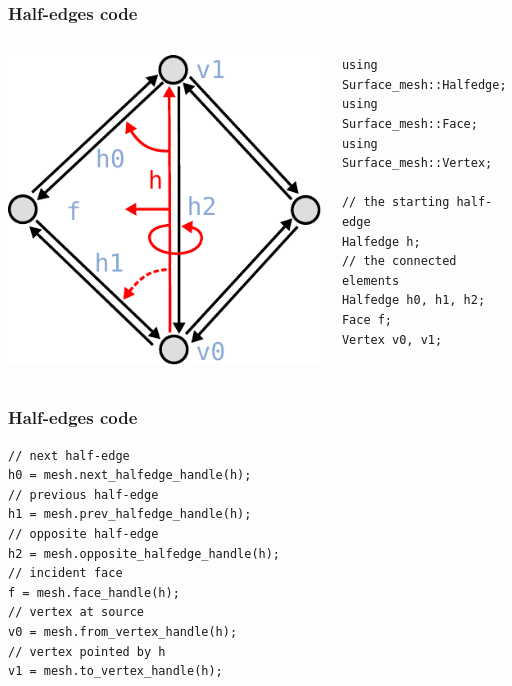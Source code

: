 \begin{frame}[fragile]
\frametitle{Half-edges code}
\begin{columns}[c]
  \begin{column}{0.4\textwidth}
\includegraphics[width=\textwidth]{figures/halfedge-queries}
  \end{column}
  \begin{column}{0.6\textwidth}
  \lstset{ 
  	numbers=none, 
  	xleftmargin=0cm, 
  	xrightmargin=0cm
  }
\begin{lstlisting}
using Surface_mesh::Halfedge;
using Surface_mesh::Face;
using Surface_mesh::Vertex;

// the starting half-edge
Halfedge h;
// the connected elements
Halfedge h0, h1, h2;
Face f;
Vertex v0, v1;
\end{lstlisting}
  \end{column}
\end{columns}
\end{frame}

\begin{frame}[fragile]
\frametitle{Half-edges code}
\begin{lstlisting}
// next half-edge
h0 = mesh.next_halfedge_handle(h);
// previous half-edge
h1 = mesh.prev_halfedge_handle(h);
// opposite half-edge
h2 = mesh.opposite_halfedge_handle(h);
// incident face
f = mesh.face_handle(h);
// vertex at source
v0 = mesh.from_vertex_handle(h);
// vertex pointed by h
v1 = mesh.to_vertex_handle(h);
\end{lstlisting}
\end{frame}
